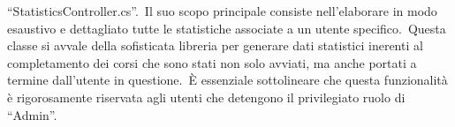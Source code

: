 ``StatisticsController.cs''.\ Il suo scopo principale consiste nell'elaborare in modo esaustivo e dettagliato tutte 
le statistiche associate a un utente specifico.\ Questa classe si avvale della sofisticata libreria  
per generare dati statistici inerenti al completamento dei corsi che sono stati non solo avviati, ma anche portati a 
termine dall'utente in questione.\ È essenziale sottolineare che questa funzionalità è rigorosamente riservata agli 
utenti che detengono il privilegiato ruolo di ``Admin''.
%





